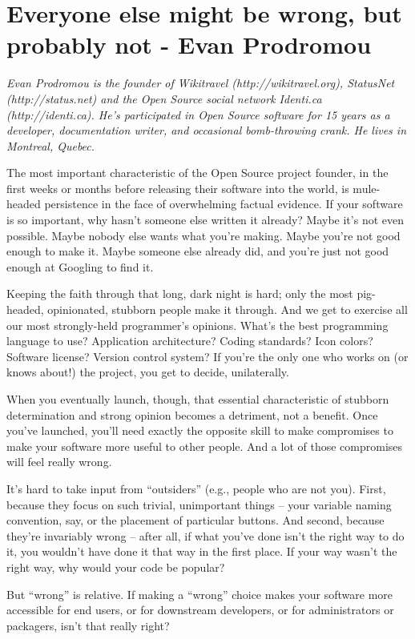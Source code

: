 \chapter{Everyone else might be wrong, but probably not - Evan Prodromou}

\textit{Evan Prodromou is the founder of Wikitravel (http://wikitravel.org),
StatusNet (http://status.net) and the Open Source social network Identi.ca
(http://identi.ca). He's participated in Open Source software for 15 years as a
developer, documentation writer, and occasional bomb-throwing crank. He lives in
Montreal, Quebec.}

The most important characteristic of the Open Source project founder, in the
first weeks or months before releasing their software into the world, is
mule-headed persistence in the face of overwhelming factual evidence. If your
software is so important, why hasn't someone else written it already? Maybe it's
not even possible. Maybe nobody else wants what you're making. Maybe you're not
good enough to make it. Maybe someone else already did, and you're just not good
enough at Googling to find it.

Keeping the faith through that long, dark night is hard; only the most
pig-headed, opinionated, stubborn people make it through. And we get to exercise
all our most strongly-held programmer's opinions. What's the best programming
language to use? Application architecture? Coding standards? Icon colors?
Software license? Version control system? If you're the only one who works on
(or knows about!) the project, you get to decide, unilaterally.

When you eventually launch, though, that essential characteristic of stubborn
determination and strong opinion becomes a detriment, not a benefit. Once you've
launched, you'll need exactly the opposite skill to make compromises to make
your software more useful to other people. And a lot of those compromises will
feel really wrong.

It's hard to take input from “outsiders” (e.g., people who are not you). First,
because they focus on such trivial, unimportant things – your variable naming
convention, say, or the placement of particular buttons. And second, because
they're invariably wrong – after all, if what you've done isn't the right way to
do it, you wouldn't have done it that way in the first place. If your way wasn't
the right way, why would your code be popular?

But “wrong” is relative. If making a “wrong” choice makes your software more
accessible for end users, or for downstream developers, or for administrators or
packagers, isn't that really right?

